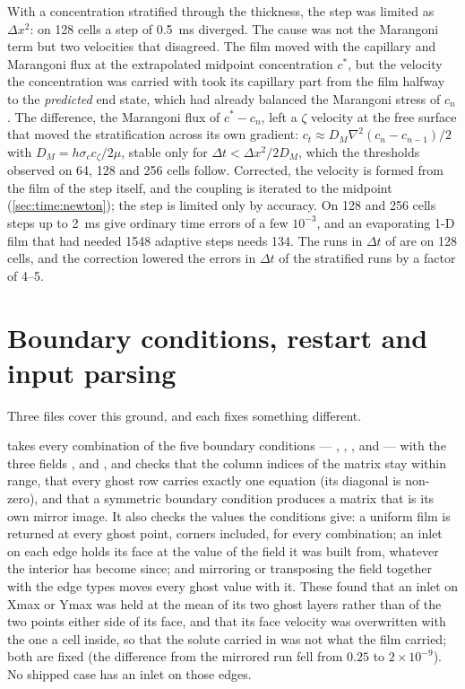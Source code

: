 With a concentration stratified through the thickness, the  step
was limited as $\Delta x^2$: on 128 cells a step of \SI{0.5}{\milli\second}
diverged. The cause was not the Marangoni term but two velocities that
disagreed. The film moved with the capillary and Marangoni flux at the
extrapolated midpoint concentration $c^*$, but the velocity the concentration
was carried with took its capillary part from the film halfway to the
\emph{predicted} end state, which had already balanced the Marangoni stress
of $c_n$. The difference, the Marangoni flux of $c^* - c_n$, left a
$\zeta$ velocity at the free surface that moved the stratification across its
own gradient: $c_t \approx D_M\nabla^2(c_n - c_{n-1})/2$ with
$D_M = h\sigma_c c_\zeta/2\mu$, stable only for
$\Delta t < \Delta x^2/2D_M$, which the thresholds observed on 64, 128 and 256
cells follow. Corrected, the velocity is formed from the film of the step
itself, and the coupling is iterated to the midpoint (\cref{sec:time:newton});
the step is limited only by accuracy. On 128 and 256 cells steps up to
\SI{2}{\milli\second} give ordinary time errors of a few $10^{-3}$, and an
evaporating 1-D film that had needed 1548 adaptive steps needs 134. The runs
in $\Delta t$ of  are on 128 cells, and the
correction lowered the errors in $\Delta t$ of the stratified runs by a
factor of 4--5.

\section{Boundary conditions, restart and input parsing}
\label{sec:verification:bcio}

Three files cover this ground, and each fixes something different.

 takes every combination of the five
boundary conditions --- , , ,
 and  --- with the three fields
,  and , and checks that the column
indices of the matrix stay within range, that every ghost row carries exactly
one equation (its diagonal is non-zero), and that a symmetric boundary
condition produces a matrix that is its own mirror image. It also checks
the values the conditions give: a uniform film is returned at every ghost
point, corners included, for every combination; an inlet on each edge holds
its face at the value of the field it was built from, whatever the interior
has become since; and mirroring or transposing the field together with the
edge types moves every ghost value with it. These found that an inlet on Xmax
or Ymax was held at the mean of its two ghost layers rather than of the two
points either side of its face, and that its face velocity was overwritten
with the one a cell inside, so that the solute carried in was not what the
film carried; both are fixed (the difference from the mirrored run fell from
$0.25$ to $2\times10^{-9}$). No shipped case has an inlet on those edges.

